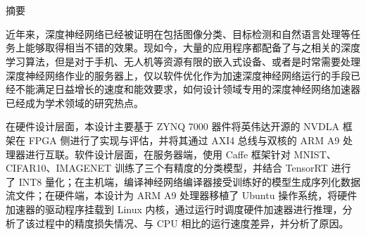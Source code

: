 \maketitle%
\pagestyle{noheaderstyle}%
\chapter[摘要]{\MyTitleCh}
\setcounter{page}{1}%

\begin{center}
\vspace{-0.3cm}
 \songti 摘要
\vspace{0.3cm}
\end{center}

近年来，深度神经网络已经被证明在包括图像分类、目标检测和自然语言处理等任务上能够取得相当不错的效果。现如今，大量的应用程序都配备了与之相关的深度学习算法，但是对于手机、无人机等资源有限的嵌入式设备、或者是时常需要处理深度神经网络作业的服务器上，仅以软件优化作为加速深度神经网络运行的手段已经不能满足日益增长的速度和能效要求，如何设计领域专用的深度神经网络加速器已经成为学术领域的研究热点。

在硬件设计层面，本设计主要基于 ZYNQ 7000 器件将英伟达开源的 NVDLA 框架在 FPGA 侧进行了实现与评估，并将其通过 AXI4 总线与双核的 ARM A9 处理器进行互联。软件设计层面，在服务器端，使用 Caffe 框架针对 MNIST、CIFAR10、IMAGENET 训练了三个有精度的分类模型，并结合 TensorRT 进行了 INT8 量化；在主机端，编译神经网络编译器接受训练好的模型生成序列化数据流文件；在硬件端，本设计为 ARM A9 处理器移植了 Ubuntu 操作系统，将硬件加速器的驱动程序挂载到 Linux 内核，通过运行时调度硬件加速器进行推理，分析了该过程中的精度损失情况、与 CPU 相比的运行速度差异，并分析了原因。

{
}
